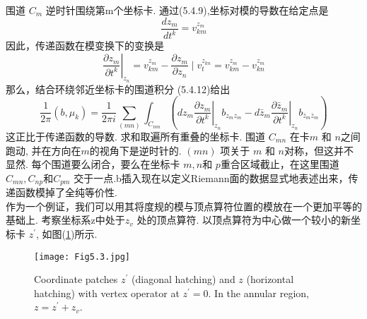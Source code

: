 围道 $C_{m}$ 逆时针围绕第m个坐标卡. 通过(5.4.9),坐标对模的导数在给定点是
\begin{equation}
	\frac{d z_{m}}{d t^{k}}=v_{k m}^{z_{m}}
\end{equation}
因此，传递函数在模变换下的变换是
\begin{equation}
	\left.\frac{\partial z_{m}}{\partial t^{k}}\right|_{z_{n}}=v_{k m}^{z_{m}}-\frac{\partial z_{m}}{\partial z_{n}} \mid v_{t}^{z_{k n}}=v_{k m}^{z_{m}}-v_{k n}^{z_{m}}
\end{equation}
那么，结合环绕邻近坐标卡的围道积分 (5.4.12)给出
\begin{equation}
	\frac{1}{2 \pi}\left(b, \mu_{k}\right)=\frac{1}{2 \pi i} \sum_{(m n)} \int_{C_{m n}}\left(\left.d z_{m} \frac{\partial z_{m}}{\partial t^{k}}\right|_{z_{n}} b_{z_{m} z_{m}}-\left.d \bar{z}_{m} \frac{\partial \bar{z}_{m}}{\partial t^{k}}\right|_{z_{n}} b_{\bar{z}_{m} \bar{z}_{m}}\right)
\end{equation}
这正比于传递函数的导数. 求和取遍所有重叠的坐标卡. 围道 $C_{m n}$ 在卡$m$ 和 $n$之间跑动, 并在方向在$m$的视角下是逆时针的.   $(m n)$ 项关于 $m$ 和 $n$对称，但这并不显然. 每个围道要么闭合，要么在坐标卡 $m, n$和 $p$重合区域截止，在这里围道 $C_{m n}, C_{n p}$和$C_{p m}$ 交于一点.b插入现在以定义Riemann面的数据显式地表述出来，传递函数模掉了全纯等价性.\\
作为一个例证，我们可以用其将度规的模与顶点算符位置的模放在一个更加平等的基础上. 考察坐标系z中处于$z_{v}$ 处的顶点算符. 以顶点算符为中心做一个较小的新坐标卡 $z^{\prime}$, 如图(\ref{Fig5.3})所示. 

\begin{figure}
	\begin{center}
		\texttt{[image: Fig5.3.jpg]}\\
		\caption{Coordinate patches $z^{\prime}$ (diagonal hatching) and $z$ (horizontal hatching) with vertex operator at $z^{\prime}=0$. In the annular region, $z=z^{\prime}+z_{v}$.}\label{Fig5.3}
	\end{center}
\end{figure}

